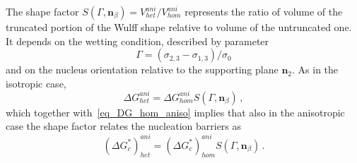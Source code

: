%        
    
    The shape factor $S(\Gamma,\bm{n}_\beta)=V_{het}^{ani}/V_{hom}^{ani}$ represents the ratio of volume of the truncated portion of the Wulff shape relative to volume of the untruncated one. It depends on the wetting condition, described by parameter
    \begin{equation}
        \Gamma=(\sigma_{2,3}-\sigma_{1,3})/\sigma_{0}
    \end{equation}
    and on the nucleus orientation relative to the supporting plane $\bm{n}_\mathit{2}$. As in the isotropic case, 
    \begin{equation}
        \Delta G_{het}^{ani} = \Delta G_{hom}^{ani} S(\Gamma,\bm{n}_\beta) \,,
    \end{equation}
    which together with~\eqref{eq_DG_hom_aniso} implies that also in the anisotropic case the shape factor relates the nucleation barriers as
    \begin{equation}
        (\Delta G^*_c)_{het}^{ani} = (\Delta G^*_c)_{hom}^{ani} S(\Gamma,\bm{n}_\beta) \,.
    \end{equation}
    
    
    
